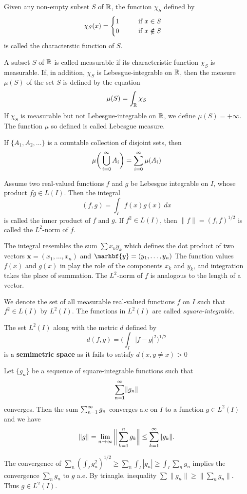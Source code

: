 \documentclass[10pt,a4paper]{book}
\begin{document}
\begin{deff}
Given any non-empty subset $S$ of $\R$, the function $\chi_S$ defined by
$$\chi_S(x) = \begin{cases}
1  \hspace*{1cm} \text{if } x \in S\\
0 \hspace*{1cm} \text{if } x \notin S
\end{cases}$$
is called the characterstic function of $S$.
\end{deff}
\begin{deff}
A subset $S$ of $\R$ is called measurable if its characteristic function
$\chi_S$ is measurable. If, in addition, $\chi_S$ is Lebesgue-integrable on $\R$, then the measure
$\mu(S)$ of the set $S$ is defined by the equation
$$\mu(S) = \int_{\R} \chi_S$$
If $\chi_S$ is measurable but not Lebesgue-integrable on $\R$, we define $\mu(S) = +\infty$. The function $\mu$ so defined is called Lebesgue measure.
\end{deff}
\begin{Thm}
If $\{A_1,A_2, \dots\}$ is a countable collection of disjoint sets, then
$$\mu\bigg(\bigcup_{i=0}^\infty A_i\bigg) = \sinf[i]{0}\mu(A_i)$$
\end{Thm}
\begin{deff}
Assume two real-valued functions $f$ and $g$ be Lebesgue integrable on $I$, whose product $f\dot g \in L(I)$. Then the integral
$$(f,g) = \int_I f(x)g(x) \ dx$$
is called the inner product of $f$ and $g$. If $f^2 \in L(I)$, then $\lVert f\rVert = (f,f)^{1/2}$ is called the $L^2$-norm of $f$.
\end{deff}
The integral resembles the sum $\sum x_ky_k$ which defines the dot product of two vectors $\mathbf{x} = (x_1, \dots, x_n)$ and $\marhbf{y} = (y_1, \dots,y_n)$ The function values $f(x)$ and $g(x)$ in play the role of the components $x_k$ and $y_k$, and integration takes the place of summation. The $L^2$-norm of $f$ is analogous to the length of a vector.
\begin{deff}
We denote the set of all measurable real-valued functions $f$ on $I$ such that $f^2 \in L(I)$ by $L^2(I)$. The functions in $L^2(I)$ are called \textit{square-integrable.}
\end{deff}
The set $L^2(I)$ along with the metric $d$ defined by
$$d(f,g) = \bigg(\int_I |f-g|^2\bigg)^{1/2}$$
is a \textbf{semimetric space} as it fails to satisfy $d(x,y \neq x) > 0$
\begin{Thm}
Let $\{g_n\}$ be a sequence of square-integrable functions such that
$$  \sinf{1}\lVert g_n \rVert$$
converges. Then the sum $\sinf{1} g_n$ converges a.e on $I$ to a function $g \in L^2(I)$ and we have
$$\lVert g \rVert = \linf \bigg \lVert \sum_{k=1}^n g_k \bigg \rVert \leq \sinf[k]{1} \lVert g_k \rVert.$$
\end{Thm}
\PP The convergence of $\sum_n (\int_I g_n^2 )^{1/2} \geq \sum_n \int_I |g_n| \geq \int_I \sum_n g_n$ implies the convergence $\sum_n g_n$ to $g$ a.e. By triangle, inequality $\sum \lVert g_n \rVert \geq \lVert \sum_n g_n \rVert$. Thus $g \in L^2(I).$
\end{document}
